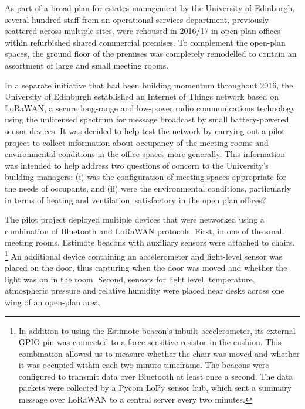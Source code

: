 As part of a broad plan for estates management by the University of
Edinburgh, several hundred staff from an operational
services department, previously scattered across multiple sites, were
rehoused in 2016/17 in open-plan offices within refurbished shared
commercial premises. To complement the open-plan spaces, the ground
floor of the premises was completely remodelled to contain an
assortment of large and small meeting rooms. 

In a separate initiative that had been building momentum throughout
2016, the University of Edinburgh established an Internet of Things
network based on LoRaWAN, a secure long-range and low-power radio
communications technology using the unlicensed spectrum for message
broadcast by small battery-powered sensor devices. It was decided to
help test the network by carrying out a pilot project to collect
information about occupancy of the meeting rooms and environmental
conditions in the office spaces more generally. This information was
intended to help address two questions of concern to the University’s
building managers: (i) was the configuration of meeting spaces
appropriate for the needs of occupants, and (ii) were the
environmental conditions, particularly in terms of heating and
ventilation, satisfactory in the open plan offices? 

The pilot project deployed multiple devices that were networked using
a combination of Bluetooth and LoRaWAN protocols. First, in one of the small
meeting rooms, Estimote beacons with auxiliary sensors were attached
to chairs.%
\footnote{
 In addition to using the Estimote beacon's inbuilt accelerometer, its
 external GPIO pin was connected to a force-sensitive resistor in the
 cushion. This combination allowed us to measure whether the chair was moved and
 whether it was occupied within each two minute timeframe. The
 beacons were configured to transmit data over Bluetooth at least once a
 second. The data packets were collected by
 a Pycom LoPy sensor hub,  which sent a summary message over LoRaWAN to a
 central server every two minutes. } 
An additional device containing an accelerometer and light-level
sensor was placed
on the door, thus capturing
when the door was moved and whether the light was on in the
room. Second, sensors for light level, temperature, atmospheric pressure
and relative humidity were placed near desks across one wing of an
open-plan area.

